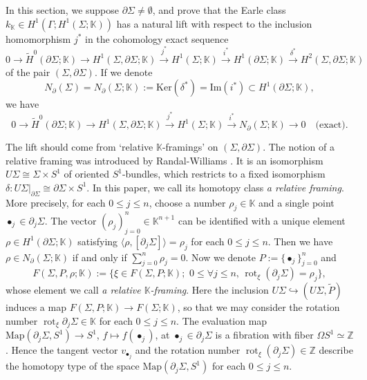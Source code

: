 \documentclass[a4paper,12pt, twoside]{amsart}
\theoremstyle{definition}
\theoremstyle{remark}
\numberwithin{equation}{section}
\newcommand\bK{{\mathbb{K}}}
\newcommand\bZ{{\mathbb{Z}}}
\newcommand\Ker{\mathrm{Ker}}
\newcommand\pa{\partial}
\newcommand\rot{\operatorname{rot}}
\begin{document}
In this section, we suppose $\pa\Sigma\neq\emptyset$, and prove that the Earle class $k_\bK \in H^1(\Gamma; H^1(\Sigma; \bK))$ %
has a natural lift with respect to the inclusion homomorphism $j^*$ in the cohomology exact sequence
$$
0 \to \widetilde{H}^0(\pa\Sigma; \bK) \to H^1(\Sigma, \pa\Sigma; \bK) 
\overset{j^*}\to H^1(\Sigma; \bK) 
\overset{i^*}\to H^1(\pa\Sigma; \bK) 
\overset{\delta^*}\to H^2(\Sigma, \pa\Sigma; \bK)
$$
of the pair $(\Sigma, \pa\Sigma)$. If we denote
$$
N_\pa(\Sigma) =  N_\pa(\Sigma; \bK) := \Ker(\delta^*) = \mathrm{Im}(i^*) \subset H^1(\pa\Sigma; \bK),
$$
we have 
\begin{equation}\label{eq:relS}
0 \to \widetilde{H}^0(\pa\Sigma; \bK) \to H^1(\Sigma, \pa\Sigma; \bK) 
\overset{j^*}\to H^1(\Sigma; \bK) 
\overset{i^*}\to N_\pa(\Sigma; \bK) \to 0\quad \text{(exact)}.
\end{equation}
\par
The lift should come from `relative $\bK$-framings' on $(\Sigma, \pa\Sigma)$. 
The notion of a relative framing was introduced by Randal-Williams \cite{RW14}. 
It is an isomorphism $U\Sigma \cong \Sigma\times S^1$ of oriented $S^1$-bundles, which restricts to a fixed isomorphism $\delta: U\Sigma\vert_{\pa\Sigma} \cong \pa\Sigma\times S^1$. 
In this paper, we call its homotopy class {\it a relative framing}. 
More precisely, for each $0 \leq j \leq n$, choose a number $\rho_j \in \bK$ and a single point $\bullet_j \in \pa_j\Sigma$. The vector $(\rho_j)^n_{j=0} \in \bK^{n+1}$
can be identified with a unique element $\rho \in H^1(\pa\Sigma; \bK)$ satisfying 
$\langle\rho, [\pa_j\Sigma]\rangle = \rho_j$ for each $0 \leq j \leq n$. 
Then we have $\rho \in N_\pa(\Sigma; \bK)$ if and only if $\sum^n_{j=0}\rho_j = 0$. 
Now we denote $P := \{\bullet_j\}^n_{j=0}$ and 
$$
F(\Sigma, P, \rho; \bK) := \{\xi \in F(\Sigma, P; \bK); \,\, 0 \leq \forall j \leq n, \, 
\rot_\xi(\pa_j\Sigma) = \rho_j\}, 
$$
whose element we call {\it a relative $\bK$-framing}. 
Here the inclusion $U\Sigma \hookrightarrow (U\Sigma, \tilde P)$ induces a map $F(\Sigma, P; \bK) \to F(\Sigma;\bK)$, so that we may consider the rotation number $\rot_\xi\pa_j\Sigma \in \bK$ for each $0 \leq j \leq n$. 
The evaluation map $\mathrm{Map}(\pa_j\Sigma, S^1) \to S^1$, $f \mapsto f(\bullet_j)$, at $\bullet_j \in \pa_j\Sigma$ is a fibration with fiber $\Omega S^1\simeq \bZ$.
Hence the tangent vector $v_{\bullet_j}$ and the rotation number $\rot_\xi(\pa_j\Sigma) \in \bZ$ describe the homotopy type of the space $\mathrm{Map}(\pa_j\Sigma, S^1)$ for each $0 \leq j \leq n$.
\end{document}
